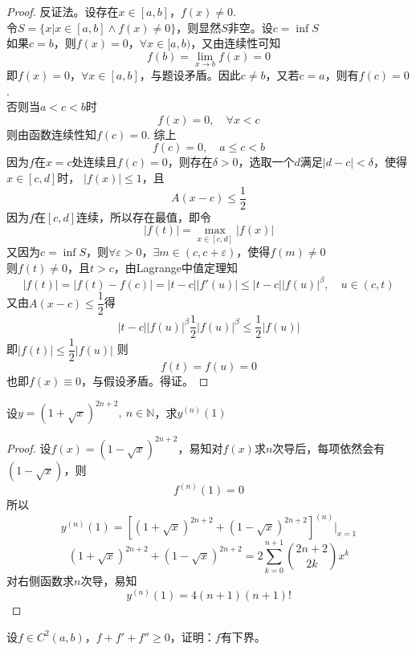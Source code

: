 \begin{proof}

    反证法。设存在$x \in [a,b]$，$f(x) \neq 0$.\\
    令$S = \{x | x \in [a,b] \land f(x) \neq 0\}$，则显然$S$非空。设$ c = \inf{S}$\\
    如果$c= b$，则$f(x) = 0$，$\forall x \in [a,b)$，又由连续性可知
    $$f(b) = \lim\limits_{x \to b}{f(x)} = 0$$
    即$f(x) = 0$，$\forall x \in [a,b]$，与题设矛盾。因此$c \neq b$，又若$c =a$，则有$f(c) = 0$.\\
    否则当$a<c<b$时
    $$f(x) = 0, \quad \forall x < c$$
    则由函数连续性知$f(c) = 0$. 综上
    $$f(c) = 0, \quad a \leq c < b$$
    因为$f$在$x = c$处连续且$f(c) = 0$，则存在$\delta > 0$，选取一个$d$满足$|d - c| < \delta$，使得$x \in [c,d]$时，
    $|f(x)| \leq 1$，且
    $$A(x - c) \leq \dfrac{1}{2}$$
    因为$f$在$[c,d]$连续，所以存在最值，即令
    $$ |f(t)| = \max_{x\in[c,d]}{|f(x)|}$$
    又因为$c = \inf{S}$，则$\forall \varepsilon > 0$，$\exists m \in (c, c + \varepsilon)$，使得$f(m) \neq 0$\\
    则$f(t) \neq 0$，且$t > c$，由\textup{Lagrange}中值定理知
    $$| f(t)| = |f(t) - f(c)| = |t-c||f'(u)| \leq |t-c||f(u)|^{\beta}, \quad u \in (c,t)$$
    又由$A(x-c) \leq \dfrac{1}{2}$得
    $$|t-c||f(u)|^{\beta} \dfrac{1}{2}|f(u)|^{\beta} \leq \dfrac{1}{2} |f(u)|$$
    即$|f(t)| \leq \dfrac{1}{2}|f(u)|$
    则
    $$f(t) = f(u) = 0$$
    也即$f(x) \equiv 0$，与假设矛盾。得证。

\end{proof}

\begin{proposition}
    
    设$y = (1 + \sqrt{x})^{2n + 2},\ n \in \mathbb{N}$，求$y^{(n)}(1)$

\end{proposition}

\begin{proof}

    设$f(x) = (1 - \sqrt{x})^{2n + 2}$，易知对$f(x)$求$n$次导后，每项依然会有$(1 - \sqrt{x})$，则
    $$f^{(n)}(1) = 0$$
    所以
    $$y^{(n)}(1) = \left[(1 + \sqrt{x})^{2n + 2} + (1 - \sqrt{x})^{2n + 2}\right]^{(n)}\Big|_{x=1}$$
    $$ (1 + \sqrt{x})^{2n + 2} + (1 - \sqrt{x})^{2n + 2} = 2 \sum\limits_{k = 0}^{n + 1}{\binom{2n + 2}{2k}x^k}$$
    对右侧函数求$n$次导，易知
    $$y^{(n)}(1) = 4(n + 1)(n + 1)!$$

\end{proof}

\begin{proposition}
    
    设$f \in C^2(a,b)$，$f + f' + f'' \geq 0$，证明：$f$有下界。

\end{proposition}

